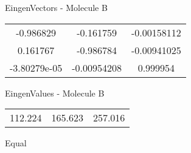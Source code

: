 \begin{multicols}{2}
\begin{center}
\vtab
 EingenVectors - Molecule B     \\
\vtab
\begin{tabular}{|c c c|}
-0.986829	 & 	-0.161759	 & 	-0.00158112	 \\
0.161767	 & 	-0.986784	 & 	-0.00941025	 \\
-3.80279e-05	 & 	-0.00954208	 & 	0.999954
\end{tabular}

\vtab
 EingenValues - Molecule B     \\
\vtab
\begin{tabular}{|c c c|}
112.224	 & 	165.623	 & 	257.016	 \\
\end{tabular}

\end{center}
\end{multicols}
\begin{center}
\vtab
\vtab
\textcolor{NavyBlue}{\Large Equal}
\end{center}

 \newpage

